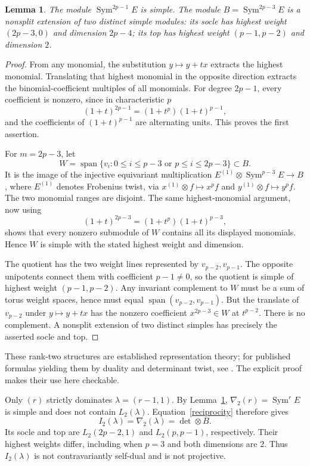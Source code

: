 \documentclass[11pt]{article}
\newtheorem{lemma}{Lemma}
\newcommand{\Sym}{\operatorname{Sym}}
\newcommand{\Span}{\operatorname{span}}
\begin{document}
\begin{lemma}\label{local}
The module \(\Sym^{2p-1}E\) is simple. The module
\(B=\Sym^{2p-3}E\) is a nonsplit extension of two distinct simple modules:
its socle has highest weight \((2p-3,0)\) and dimension \(2p-4\);
its top has highest weight \((p-1,p-2)\) and dimension \(2\).
\end{lemma}
\begin{proof}
From any monomial, the substitution \(y\mapsto y+t x\) extracts the
highest monomial. Translating that highest monomial in the opposite
direction extracts the binomial-coefficient multiples of all monomials.
For degree \(2p-1\), every coefficient is nonzero, since in characteristic \(p\)
\[
 (1+t)^{2p-1}=(1+t^p)(1+t)^{p-1},
\]
and the coefficients of \((1+t)^{p-1}\) are alternating units.
This proves the first assertion.

For \(m=2p-3\), let
\[
 W=\Span\{v_i:0\le i\le p-3\text{ or }p\le i\le2p-3\}\subset B.
\]
It is the image of the injective equivariant multiplication
\(E^{(1)}\otimes\Sym^{p-3}E\to B\), where \(E^{(1)}\) denotes Frobenius
twist, via \(x^{(1)}\otimes f\mapsto x^p f\) and
\(y^{(1)}\otimes f\mapsto y^p f\). The two monomial ranges are disjoint. The same highest-monomial
argument, now using
\[
 (1+t)^{2p-3}=(1+t^p)(1+t)^{p-3},
\]
shows that every nonzero submodule of \(W\) contains all its displayed
monomials. Hence \(W\) is simple with the stated highest weight and dimension.

The quotient has the two weight lines represented by \(v_{p-2},v_{p-1}\).
The opposite unipotents connect them with coefficient \(p-1\ne0\), so the
quotient is simple of highest weight \((p-1,p-2)\).
Any invariant complement to \(W\) must be a sum of torus weight spaces,
hence must equal \(\Span(v_{p-2},v_{p-1})\).
But the translate of \(v_{p-2}\) under \(y\mapsto y+t x\) has the
nonzero coefficient \(x^{2p-3}\in W\) at \(t^{p-2}\).
There is no complement. A nonsplit extension of two distinct simples
has precisely the asserted socle and top.
\end{proof}

These rank-two structures are established representation theory;
for published formulas yielding them by duality and determinant twist, see
\cite[Proposition~3.1, classical analogue, and Theorem~3.3]{EL}.
The explicit proof makes their use here checkable.

Only \((r)\) strictly dominates \(\lambda=(r-1,1)\).
By Lemma~\ref{local}, \(\nabla_2(r)=\Sym^r E\) is simple and does not
contain \(L_2(\lambda)\). Equation~\eqref{reciprocity} therefore gives
\[
 I_2(\lambda)=\nabla_2(\lambda)=\det\otimes B.
\]
Its socle and top are \(L_2(2p-2,1)\) and \(L_2(p,p-1)\), respectively.
Their highest weights differ, including when \(p=3\) and both dimensions
are \(2\). Thus \(I_2(\lambda)\) is not contravariantly self-dual and
is not projective.
\end{document}
